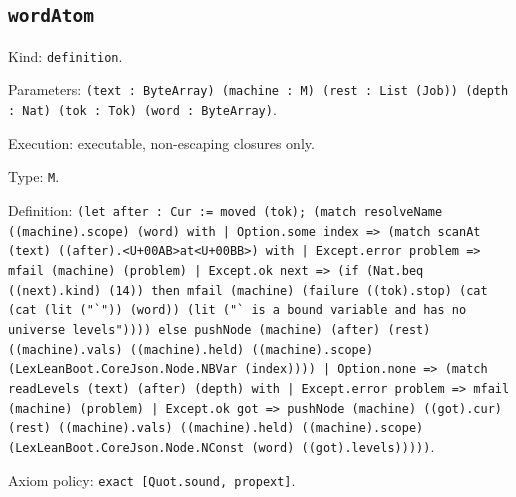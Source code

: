 \documentclass[11pt]{article}
\begin{document}
\subsection*{\texttt{wordAtom}}
\noindent Kind: \texttt{definition}.\par
\noindent Parameters: \texttt{(text : ByteArray) (machine : M) (rest : List (Job)) (depth : Nat) (tok : Tok) (word : ByteArray)}.\par
\noindent Execution: executable, non-escaping closures only.\par
\noindent Type: \texttt{M}.\par
\noindent Definition: \texttt{(let after : Cur := moved (tok); (match resolveName ((machine).scope) (word) with | Option.some index => (match scanAt (text) ((after).<U+00AB>at<U+00BB>) with | Except.error problem => mfail (machine) (problem) | Except.ok next => (if (Nat.beq ((next).kind) (14)) then mfail (machine) (failure ((tok).stop) (cat (cat (lit ("`")) (word)) (lit ("` is a bound variable and has no universe levels")))) else pushNode (machine) (after) (rest) ((machine).vals) ((machine).held) ((machine).scope) (LexLeanBoot.CoreJson.Node.NBVar (index)))) | Option.none => (match readLevels (text) (after) (depth) with | Except.error problem => mfail (machine) (problem) | Except.ok got => pushNode (machine) ((got).cur) (rest) ((machine).vals) ((machine).held) ((machine).scope) (LexLeanBoot.CoreJson.Node.NConst (word) ((got).levels)))))}.\par
\noindent Axiom policy: \texttt{exact [Quot.sound, propext]}.\par
\end{document}
